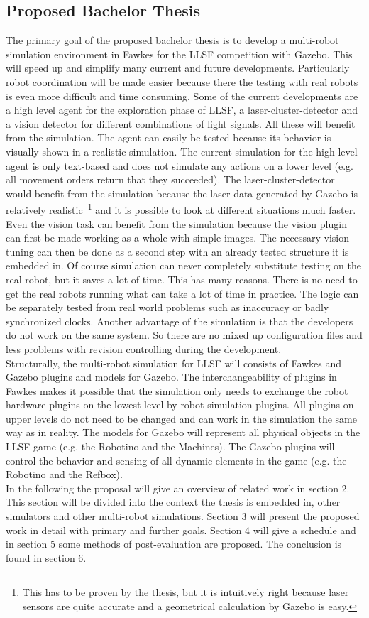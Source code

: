 \documentclass[a4paper,11pt]{article}
\begin{document}
\subsection{Proposed Bachelor Thesis}
The primary goal of the proposed bachelor thesis is to develop a multi-robot simulation environment in Fawkes for the LLSF competition with Gazebo. This will speed up and simplify many current and future developments. Particularly robot coordination will be made easier because there the testing with real robots is even more difficult and time consuming. Some of the current developments are a high level agent for the exploration phase of LLSF, a laser-cluster-detector and a vision detector for different combinations of light signals. All these will benefit from the simulation. The agent can easily be tested because its behavior is visually shown in  a realistic simulation. The current simulation for the high level agent is only text-based and does not simulate any actions on a lower level (e.g. all movement orders return that they succeeded). The laser-cluster-detector would benefit from the simulation because the laser data generated by Gazebo is relatively realistic~\footnote{This has to be proven by the thesis, but it is intuitively right because laser sensors are quite accurate and a geometrical calculation by Gazebo is easy.} and it is possible to look at different situations much faster. Even the vision task can benefit from the simulation because the vision plugin can first be made working as a whole with simple images. The necessary vision tuning can then be done as a second step with an already tested structure it is embedded in. Of course simulation can never completely substitute testing on the real robot, but it saves a lot of time. This has many reasons. There is no need to get the real robots running what can take a lot of time in practice. The logic can be separately tested from real world problems such as inaccuracy or badly synchronized clocks. Another advantage of the simulation is that the developers do not work on the same system. So there are no mixed up configuration files and less problems with revision controlling during the development.\\
Structurally, the multi-robot simulation for LLSF will consists of Fawkes and Gazebo plugins and models for Gazebo. The interchangeability of plugins in Fawkes makes it possible that the simulation only needs to exchange the robot hardware plugins on the lowest level by robot simulation plugins. All plugins on upper levels do not need to be changed and can work in the simulation the same way as in reality. The models for Gazebo will represent all physical objects in the LLSF game (e.g. the Robotino and the Machines). The Gazebo plugins will control the behavior and sensing of all dynamic elements in the game (e.g. the Robotino and the Refbox).\\
In the following the proposal will give an overview of related work in section 2. This section will be divided into the context the thesis is embedded in, other simulators and other multi-robot simulations. Section 3 will present the proposed work in detail with primary and further goals. Section 4 will give a schedule and in section 5 some methods of post-evaluation are proposed. The conclusion is found in section 6.
\end{document}

